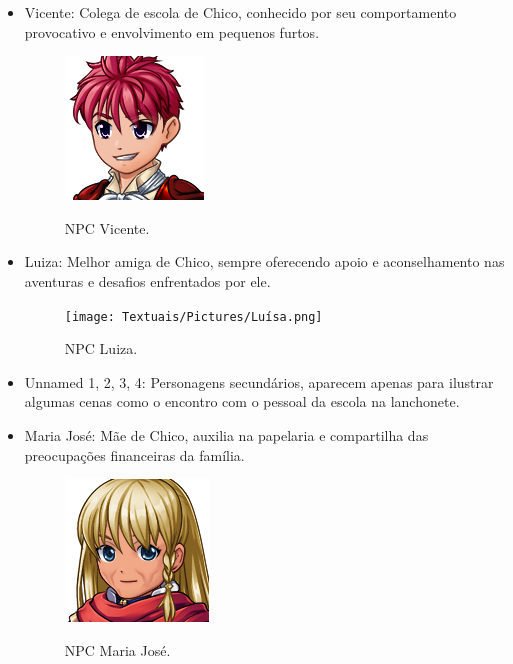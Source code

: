 \begin{itemize}
	      \newpage

	\item Vicente: Colega de escola de Chico, conhecido por seu comportamento provocativo e envolvimento em pequenos furtos.
	      \begin{figure}[ht]
		      \centering
		      \caption{NPC Vicente.}
		      \includegraphics[scale=0.8]{Textuais/Pictures/Vicente.png}
		      \label{fig:npc-vicente}
	      \end{figure}
	\item Luiza: Melhor amiga de Chico, sempre oferecendo apoio e aconselhamento nas aventuras e desafios enfrentados por ele.
	      \begin{figure}[ht]
		      \centering
		      \caption{NPC Luiza.}
		      \texttt{[image: Textuais/Pictures/Luísa.png]}
		      \label{fig:npc-luiza}
	      \end{figure}
	\item Unnamed 1, 2, 3, 4: Personagens secundários, aparecem apenas para ilustrar algumas cenas como o encontro com o pessoal da escola na lanchonete.
	\item Maria José: Mãe de Chico, auxilia na papelaria e compartilha das preocupações financeiras da família.
	      \begin{figure}[ht]
		      \centering
		      \caption{NPC Maria José.}
		      \includegraphics[scale=0.8]{Textuais/Pictures/Maria.png}
		      \label{fig:npc-maria-jose}
	      \end{figure}

	      \newpage


\end{itemize}
